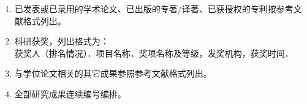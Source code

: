 \documentclass[
    master,
    pdflinks,
    ]{xjtuthesis}
\begin{document}
    

    \xjtuchead
    \xjtuehead
    \xjtucinfopage
    \xjtueinfopage
    \xjtutoc
    \xjtutoe
    \clearpage

    

    \xjtucontent

        

        

        

        

        

        

    \xjtuendcontent


    \xjtuappendix

        

    \xjtuendappendix


        


        \begin{enumerate}
            \item 已发表或已录用的学术论文、已出版的专著/译著、已获授权的专利按参考文献格式列出。
            \item 科研获奖，列出格式为：\\
                获奖人（排名情况）．项目名称．奖项名称及等级，发奖机构，获奖时间．
            \item 与学位论文相关的其它成果参照参考文献格式列出。
            \item 全部研究成果连续编号编排。
        \end{enumerate}

    \xjtuacademicintegrity
\end{document}
